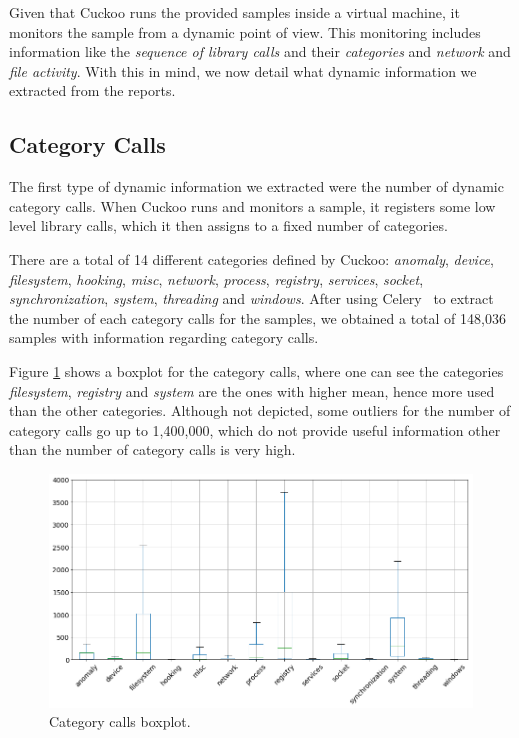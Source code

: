 Given that Cuckoo runs the provided samples inside a virtual machine, it monitors the sample from a dynamic point of view.
This monitoring includes information like the \emph{sequence of library calls} and their \emph{categories} and \emph{network} and \emph{file activity}.
With this in mind, we now detail what dynamic information we extracted from the reports.

\subsection{Category Calls}
\label{section:improvements_categories}

The first type of dynamic information we extracted were the number of dynamic category calls.
When Cuckoo runs and monitors a sample, it registers some low level library calls, which it then assigns to a fixed number of categories.

There are a total of 14 different categories defined by Cuckoo: \textit{anomaly}, \textit{device}, \textit{filesystem}, \textit{hooking}, \textit{misc}, \textit{network}, \textit{process}, \textit{registry}, \textit{services}, \textit{socket}, \textit{synchronization}, \textit{system}, \textit{threading} and \textit{windows}.
After using Celery~\cite{tool:celery} to extract the number of each category calls for the samples, we obtained a total of 148,036 samples with information regarding category calls.

Figure \ref{fig:boxplot_category_calls} shows a boxplot for the category calls, where one can see the categories \textit{filesystem}, \textit{registry} and \textit{system} are the ones with higher mean, hence more used than the other categories.
Although not depicted, some outliers for the number of category calls go up to 1,400,000, which do not provide useful information other than the number of category calls is very high.

\begin{figure}[!htb]
	\centering
	\includegraphics[width=\textwidth]{Figures/boxplot_category_calls.png}
	\caption{Category calls boxplot.}
	\label{fig:boxplot_category_calls}
\end{figure}

